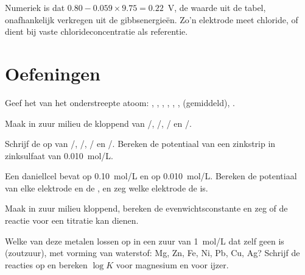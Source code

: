 Numeriek is dat $0.80 - 0.059 \times 9.75 = 0.22$~V, de waarde uit de
tabel, onafhankelijk verkregen uit de gibbsenergieën. Zo'n elektrode
meet chloride, of dient bij vaste chlorideconcentratie als referentie.

\section{Oefeningen}

\begin{exercise}[$\star$]\label{exo:b1:nernst:1}
Geef het  van het onderstreepte atoom: ,
, , ,
, , 
(gemiddeld), .
\end{exercise}

\begin{exercise}[$\star$]\label{exo:b1:nernst:2}
Maak in zuur milieu de  kloppend van /,
/, / en /.
\end{exercise}

\begin{exercise}[$\star$]\label{exo:b1:nernst:3}
Schrijf de  op van /,
/, / en /. Bereken de
potentiaal van een zinkstrip in zinksulfaat van \qty{0.010}{mol/L}.
\end{exercise}

\begin{exercise}[$\star$]\label{exo:b1:nernst:4}
Een daniellcel bevat  op \qty{0.10}{mol/L} en  op
\qty{0.010}{mol/L}. Bereken de potentiaal van elke elektrode en de
, en zeg welke elektrode de  is.
\end{exercise}

\begin{exercise}[$\star\star$]\label{exo:b1:nernst:5}
Maak  in zuur milieu kloppend, bereken de
evenwichtsconstante en zeg of de reactie voor een titratie kan dienen.
\end{exercise}

\begin{exercise}[$\star\star$]\label{exo:b1:nernst:6}
Welke van deze metalen lossen op in een zuur van \qty{1}{mol/L} dat zelf
geen  is (zoutzuur), met vorming van waterstof: Mg, Zn, Fe, Ni,
Pb, Cu, Ag? Schrijf de reacties op en bereken $\log K$ voor magnesium en
voor ijzer.
\end{exercise}

